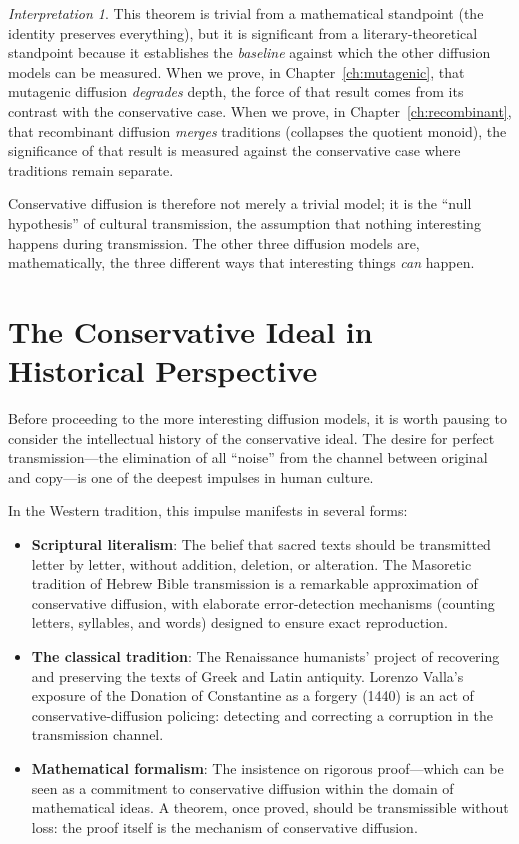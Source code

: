 \documentclass[11pt,openany]{book}
\theoremstyle{definition}
\theoremstyle{plain}
\theoremstyle{remark}
\newtheorem{interpretation}[axiom]{Interpretation}
\begin{document}
\begin{interpretation}
This theorem is trivial from a mathematical standpoint (the identity preserves everything), but it is significant from a literary-theoretical standpoint because it establishes the \emph{baseline} against which the other diffusion models can be measured. When we prove, in Chapter~\ref{ch:mutagenic}, that mutagenic diffusion \emph{degrades} depth, the force of that result comes from its contrast with the conservative case. When we prove, in Chapter~\ref{ch:recombinant}, that recombinant diffusion \emph{merges} traditions (collapses the quotient monoid), the significance of that result is measured against the conservative case where traditions remain separate.

Conservative diffusion is therefore not merely a trivial model; it is the ``null hypothesis'' of cultural transmission, the assumption that nothing interesting happens during transmission. The other three diffusion models are, mathematically, the three different ways that interesting things \emph{can} happen.
\end{interpretation}

\section{The Conservative Ideal in Historical Perspective}

Before proceeding to the more interesting diffusion models, it is worth pausing to consider the intellectual history of the conservative ideal. The desire for perfect transmission---the elimination of all ``noise'' from the channel between original and copy---is one of the deepest impulses in human culture.

In the Western tradition, this impulse manifests in several forms:
\begin{itemize}
\item \textbf{Scriptural literalism}: The belief that sacred texts should be transmitted letter by letter, without addition, deletion, or alteration. The Masoretic tradition of Hebrew Bible transmission is a remarkable approximation of conservative diffusion, with elaborate error-detection mechanisms (counting letters, syllables, and words) designed to ensure exact reproduction.

\item \textbf{The classical tradition}: The Renaissance humanists' project of recovering and preserving the texts of Greek and Latin antiquity. Lorenzo Valla's exposure of the Donation of Constantine as a forgery (1440) is an act of conservative-diffusion policing: detecting and correcting a corruption in the transmission channel.

\item \textbf{Mathematical formalism}: The insistence on rigorous proof---which can be seen as a commitment to conservative diffusion within the domain of mathematical ideas. A theorem, once proved, should be transmissible without loss: the proof itself is the mechanism of conservative diffusion.
\end{itemize}
\end{document}
